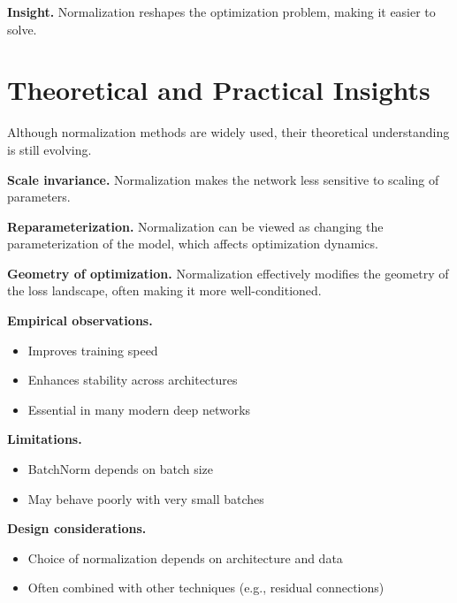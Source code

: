 \noindent
\textbf{Insight.}  
Normalization reshapes the optimization problem, making it easier to solve.

\section{Theoretical and Practical Insights}

Although normalization methods are widely used, their theoretical understanding is still evolving.

\medskip

\noindent
\textbf{Scale invariance.}  
Normalization makes the network less sensitive to scaling of parameters.

\medskip

\noindent
\textbf{Reparameterization.}  
Normalization can be viewed as changing the parameterization of the model, which affects optimization dynamics.

\medskip

\noindent
\textbf{Geometry of optimization.}  
Normalization effectively modifies the geometry of the loss landscape, often making it more well-conditioned.

\medskip

\noindent
\textbf{Empirical observations.}
\begin{itemize}
    \item Improves training speed
    \item Enhances stability across architectures
    \item Essential in many modern deep networks
\end{itemize}

\medskip

\noindent
\textbf{Limitations.}
\begin{itemize}
    \item BatchNorm depends on batch size
    \item May behave poorly with very small batches
\end{itemize}

\medskip

\noindent
\textbf{Design considerations.}
\begin{itemize}
    \item Choice of normalization depends on architecture and data
    \item Often combined with other techniques (e.g., residual connections)
\end{itemize}

\medskip

